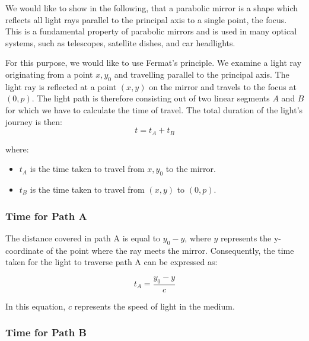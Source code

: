 \documentclass[
  a4paper,
]{book}
\providecommand{\tightlist}{%
  \setlength{\itemsep}{0pt}\setlength{\parskip}{0pt}}
\begin{document}
\begin{tcolorbox}[enhanced jigsaw, breakable, toptitle=1mm, bottomrule=.15mm, colbacktitle=quarto-callout-note-color!10!white, title=\textcolor{quarto-callout-note-color}{\faInfo}\hspace{0.5em}{Parabolic Mirrors Focus Parallel Rays}, arc=.35mm, rightrule=.15mm, bottomtitle=1mm, opacityback=0, toprule=.15mm, coltitle=black, leftrule=.75mm, opacitybacktitle=0.6, colback=white, left=2mm, titlerule=0mm, colframe=quarto-callout-note-color-frame]

We would like to show in the following, that a parabolic mirror is a
shape which reflects all light rays parallel to the principal axis to a
single point, the focus. This is a fundamental property of parabolic
mirrors and is used in many optical systems, such as telescopes,
satellite dishes, and car headlights.

For this purpose, we would like to use Fermat's principle. We examine a
light ray originating from a point \(x,y_0\) and travelling parallel to
the principal axis. The light ray is reflected at a point \((x,y)\) on
the mirror and travels to the focus at \((0,p)\). The light path is
therefore consisting out of two linear segments \(A\) and \(B\) for
which we have to calculate the time of travel. The total duration of the
light's journey is then: \[
t = t_A + t_B
\]

where:

\begin{itemize}
\tightlist
\item
  \(t_A\) is the time taken to travel from \(x,y_0\) to the mirror.
\item
  \(t_B\) is the time taken to travel from \((x,y)\) to \((0,p)\).
\end{itemize}

\subsubsection{Time for Path A}\label{time-for-path-a}

The distance covered in path A is equal to \(y_0 - y\), where \(y\)
represents the y-coordinate of the point where the ray meets the mirror.
Consequently, the time taken for the light to traverse path A can be
expressed as:

\[
t_A = \frac{y_0 - y}{c}
\]

In this equation, \(c\) represents the speed of light in the medium.

\subsubsection{Time for Path B}\label{time-for-path-b}


\end{tcolorbox}
\end{document}

